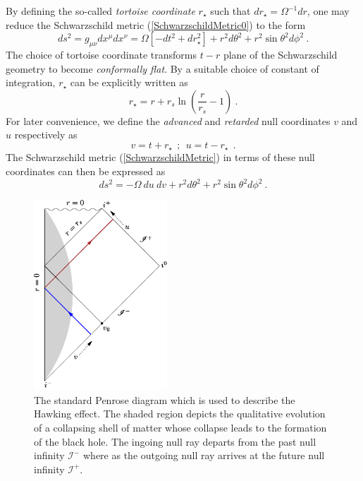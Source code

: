 \documentclass[aps,twocolumn,showpacs]{revtex4}
\def\rstar{r_{\star}}
\def\scriplus{\mathscr{I}^{+}}
\def\scriminus{\mathscr{I}^{-}}
\begin{document}
%
By defining the so-called \emph{tortoise coordinate} $\rstar$ such that $d\rstar 
= \Omega^{-1} dr$, one may reduce the Schwarzschild metric 
(\ref{SchwarzschildMetric0}) to the form
%
\begin{equation}\label{SchwarzschildMetric}
ds^2 = g_{\mu\nu}dx^{\mu}dx^{\nu} =  \Omega \left[ - dt^2 + d\rstar^2 \right] 
  + r^2 d\theta^2 + r^2 \sin\theta^2 d\phi^2 ~. 
\end{equation}
% 
The choice of tortoise coordinate transforms $t-r$ plane of the
Schwarzschild geometry to become \emph{conformally flat}. By a suitable 
choice of constant of integration, $\rstar$ can be explicitly written as
%
\begin{equation}\label{TortoiseCoordinate}
\rstar = r + r_s \ln \left(\frac{r}{r_{s}}-1\right)  ~.
\end{equation}
%
For later convenience, we define the \emph{advanced} and \emph{retarded} null 
coordinates $v$ and $u$ respectively as
%
\begin{equation}\label{AdvancedRetardedNullCoordinates}
v = t + \rstar  ~~;~~  u = t - \rstar ~~.
\end{equation}
%
The Schwarzschild metric (\ref{SchwarzschildMetric}) in terms of these null 
coordinates can then be expressed as
%
\begin{equation}\label{SchwarzschildMetricNullCoordinates}
ds^2 =  - \Omega~ du~ dv + r^2 d\theta^2 + r^2 \sin\theta^2 
d\phi^2 ~. 
\end{equation}
% 



\begin{figure}
\includegraphics[width=5cm]{penrose-collapse.pdf}
\caption{The standard Penrose diagram which is used to describe the Hawking 
effect. The shaded region depicts the qualitative evolution of a collapsing 
shell of matter whose collapse leads to the formation of the black hole. The 
ingoing null ray departs from the past null infinity $\scriminus$ where as the 
outgoing null ray arrives at the future null infinity $\scriplus$. }
\label{fig:BHPenroseDiagram} 
\end{figure}
\end{document}
